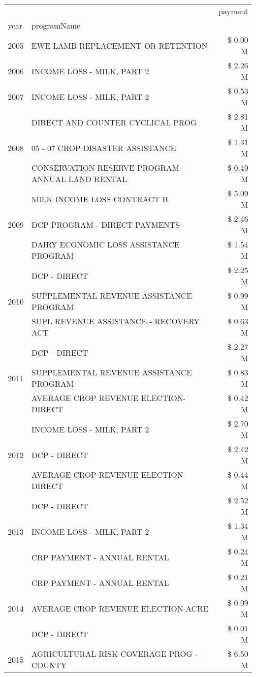 \begin{tabular}{llr}
\toprule
 &  & payment \\
year & programName &  \\
\midrule
2005 & EWE LAMB REPLACEMENT OR RETENTION & \$ 0.00 M \\
\cline{1-3}
2006 & INCOME LOSS - MILK, PART 2 & \$ 2.26 M \\
\cline{1-3}
2007 & INCOME LOSS - MILK, PART 2 & \$ 0.53 M \\
\cline{1-3}
\multirow[t]{3}{*}{2008} & DIRECT AND COUNTER CYCLICAL PROG & \$ 2.81 M \\
 & 05 - 07 CROP DISASTER ASSISTANCE & \$ 1.31 M \\
 & CONSERVATION RESERVE PROGRAM - ANNUAL LAND RENTAL & \$ 0.49 M \\
\cline{1-3}
\multirow[t]{3}{*}{2009} & MILK INCOME LOSS CONTRACT II & \$ 5.09 M \\
 & DCP PROGRAM - DIRECT PAYMENTS & \$ 2.46 M \\
 & DAIRY ECONOMIC LOSS ASSISTANCE PROGRAM & \$ 1.54 M \\
\cline{1-3}
\multirow[t]{3}{*}{2010} & DCP - DIRECT & \$ 2.25 M \\
 & SUPPLEMENTAL REVENUE ASSISTANCE PROGRAM & \$ 0.99 M \\
 & SUPL REVENUE ASSISTANCE - RECOVERY ACT & \$ 0.63 M \\
\cline{1-3}
\multirow[t]{3}{*}{2011} & DCP - DIRECT & \$ 2.27 M \\
 & SUPPLEMENTAL REVENUE ASSISTANCE PROGRAM & \$ 0.83 M \\
 & AVERAGE CROP REVENUE ELECTION-DIRECT & \$ 0.42 M \\
\cline{1-3}
\multirow[t]{3}{*}{2012} & INCOME LOSS - MILK, PART 2 & \$ 2.70 M \\
 & DCP - DIRECT & \$ 2.42 M \\
 & AVERAGE CROP REVENUE ELECTION-DIRECT & \$ 0.44 M \\
\cline{1-3}
\multirow[t]{3}{*}{2013} & DCP - DIRECT & \$ 2.52 M \\
 & INCOME LOSS - MILK, PART 2 & \$ 1.34 M \\
 & CRP PAYMENT - ANNUAL RENTAL & \$ 0.24 M \\
\cline{1-3}
\multirow[t]{3}{*}{2014} & CRP PAYMENT - ANNUAL RENTAL & \$ 0.21 M \\
 & AVERAGE CROP REVENUE ELECTION-ACRE & \$ 0.09 M \\
 & DCP - DIRECT & \$ 0.01 M \\
\cline{1-3}
\multirow[t]{3}{*}{2015} & AGRICULTURAL RISK COVERAGE PROG - COUNTY & \$ 6.50 M \\

\end{tabular}
